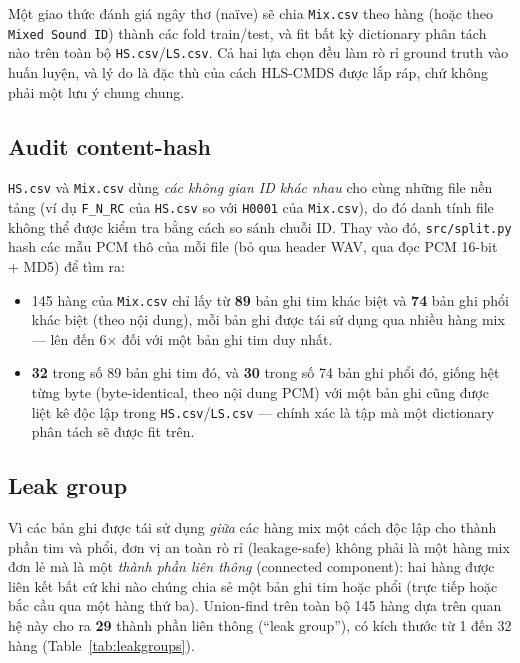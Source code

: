 \documentclass[11pt]{article}
\begin{document}
Một giao thức đánh giá ngây thơ (na\"ive) sẽ chia \texttt{Mix.csv} theo
hàng (hoặc theo \texttt{Mixed Sound ID}) thành các fold train/test, và fit
bất kỳ dictionary phân tách nào trên toàn bộ \texttt{HS.csv}/\texttt{LS.csv}.
Cả hai lựa chọn đều làm rò rỉ ground truth vào huấn luyện, và lý do là đặc
thù của cách HLS-CMDS được lắp ráp, chứ không phải một lưu ý chung chung.

\subsection{Audit content-hash}

\texttt{HS.csv} và \texttt{Mix.csv} dùng \emph{các không gian ID khác
nhau} cho cùng những file nền tảng (ví dụ \texttt{F\_N\_RC} của
\texttt{HS.csv} so với \texttt{H0001} của \texttt{Mix.csv}), do đó danh
tính file không thể được kiểm tra bằng cách so sánh chuỗi ID. Thay vào
đó, \texttt{src/split.py} hash các mẫu PCM thô của mỗi file (bỏ qua
header WAV, qua đọc PCM 16-bit + MD5) để tìm ra:

\begin{itemize}
  \item 145 hàng của \texttt{Mix.csv} chỉ lấy từ \textbf{89} bản ghi tim
    khác biệt và \textbf{74} bản ghi phổi khác biệt (theo nội dung), mỗi
    bản ghi được tái sử dụng qua nhiều hàng mix --- lên đến 6$\times$ đối
    với một bản ghi tim duy nhất.
  \item \textbf{32} trong số 89 bản ghi tim đó, và \textbf{30} trong số
    74 bản ghi phổi đó, giống hệt từng byte (byte-identical, theo nội
    dung PCM) với một bản ghi cũng được liệt kê độc lập trong
    \texttt{HS.csv}/\texttt{LS.csv} --- chính xác là tập mà một dictionary
    phân tách sẽ được fit trên.
\end{itemize}

\subsection{Leak group}

Vì các bản ghi được tái sử dụng \emph{giữa} các hàng mix một cách độc lập
cho thành phần tim và phổi, đơn vị an toàn rò rỉ (leakage-safe) không phải
là một hàng mix đơn lẻ mà là một \emph{thành phần liên thông} (connected
component): hai hàng được liên kết bất cứ khi nào chúng chia sẻ một bản
ghi tim hoặc phổi (trực tiếp hoặc bắc cầu qua một hàng thứ ba). Union-find
trên toàn bộ 145 hàng dựa trên quan hệ này cho ra \textbf{29} thành phần
liên thông (``leak group''), có kích thước từ 1 đến 32 hàng
(Table~\ref{tab:leakgroups}).
\end{document}
